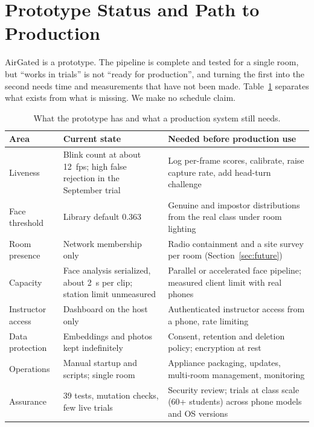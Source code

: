 \documentclass[11pt,a4paper]{article}
\newcommand{\sys}{AirGated}
\begin{document}
\section{Prototype Status and Path to Production}\label{sec:status}
\sys{} is a prototype. The pipeline is complete and tested for a single room, but ``works in trials'' is not ``ready for production'', and turning the first into the second needs time and measurements that have not been made. Table~\ref{tab:readiness} separates what exists from what is missing. We make no schedule claim.

\begin{table}[t]
\centering
\small
\begin{tabular}{@{}p{3.2cm}p{4.9cm}p{5.8cm}@{}}
\toprule
Area & Current state & Needed before production use \\
\midrule
Liveness & Blink count at about 12~fps; high false rejection in the September trial & Log per-frame scores, calibrate, raise capture rate, add head-turn challenge \\
\addlinespace
Face threshold & Library default 0.363 & Genuine and impostor distributions from the real class under room lighting \\
\addlinespace
Room presence & Network membership only & Radio containment and a site survey per room (Section~\ref{sec:future}) \\
\addlinespace
Capacity & Face analysis serialized, about 2~s per clip; station limit unmeasured & Parallel or accelerated face pipeline; measured client limit with real phones \\
\addlinespace
Instructor access & Dashboard on the host only & Authenticated instructor access from a phone, rate limiting \\
\addlinespace
Data protection & Embeddings and photos kept indefinitely & Consent, retention and deletion policy; encryption at rest \\
\addlinespace
Operations & Manual startup and scripts; single room & Appliance packaging, updates, multi-room management, monitoring \\
\addlinespace
Assurance & 39 tests, mutation checks, few live trials & Security review; trials at class scale (60+ students) across phone models and OS versions \\
\bottomrule
\end{tabular}
\caption{What the prototype has and what a production system still needs.}
\label{tab:readiness}
\end{table}
\end{document}
